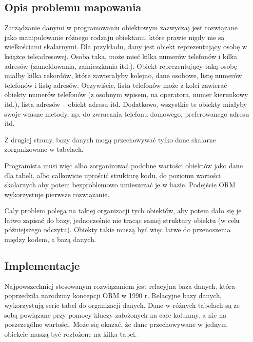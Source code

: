 \documentclass[a4paper,12pt,oneside]{report}
\begin{document}
\subsection{Opis problemu mapowania}
\label{subsec:orm-problem}
Zarządzanie danymi w programowaniu obiektowym zazwyczaj jest rozwiązane jako manipulowanie różnego rodzaju obiektami, które prawie nigdy nie są wielkościami skalarnymi. Dla przykładu, dany jest obiekt reprezentujący osobę w książce teleadresowej. Osoba taka, może mieć kilka numerów telefonów i kilka adresów (zameldowania, zamieszkania itd.). Obiekt reprezentujący taką osobę miałby kilka rekordów, które zawierałyby kolejno, dane osobowe, listę numerów telefonów i listę adresów. Oczywiście, lista telefonów może z kolei zawierać obiekty numerów telefonów (z osobnym wpisem, na operatora, numer kierunkowy itd.), lista adresów -- obiekt adresu itd. Dodatkowo, wszystkie te obiekty miałyby swoje własne metody, np. do zwracania telefonu domowego, preferowanego adresu itd.

Z drugiej strony, bazy danych mogą przechowywać tylko dane skalarne zorganizowane w tabelach.

Programista musi więc albo zorganizować podobne wartości obiektów jako dane dla tabeli, albo całkowicie uprościć strukturę kodu, do poziomu wartości skalarnych aby potem bezproblemowo umieszczać je w bazie. Podejście ORM wykorzystuje pierwsze rozwiązanie.

Cały problem polega na takiej organizacji tych obiektów, aby potem dało się je łatwo zapisać do bazy, jednocześnie nie tracąc samej struktury obiektu (w celu późniejszego odczytu). Obiekty takie muszą być więc łatwe do przenoszenia między kodem, a bazą danych.

\subsection{Implementacje}
\label{subsec:orm-implementacje}
Najpowszechniej stosowanym rozwiązaniem jest relacyjna baza danych, która poprzedziła narodziny koncepcji ORM w 1990 r. Relacyjne bazy danych, wykorzystują serie tabel do organizacji danych. Dane w różnych tabelach są ze sobą powiązane przy pomocy kluczy założonych na całe kolumny, a nie na poszczególne wartości. Może się okazać, że dane przechowywane w jednym obiekcie muszą być rozłożone na kilka tabel.
\end{document}

